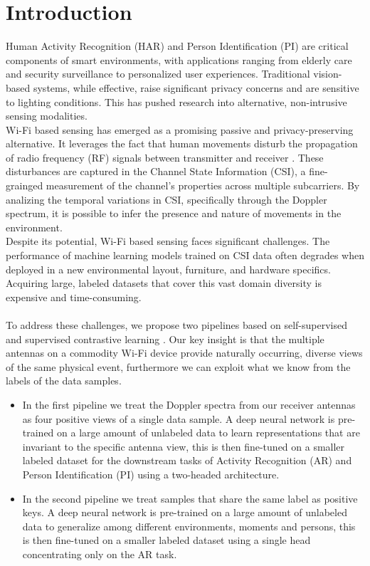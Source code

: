 
\section{Introduction}
\label{sec:introduction}

Human Activity Recognition (HAR) and Person Identification (PI) are critical components of smart environments, with applications ranging from elderly care and security surveillance to personalized user experiences. Traditional vision-based systems, while effective, raise significant privacy concerns and are sensitive to lighting conditions. This has pushed research into alternative, non-intrusive sensing modalities.\\
Wi-Fi based sensing has emerged as a promising passive and privacy-preserving alternative. It leverages the fact that human movements disturb the propagation of radio frequency (RF) signals between transmitter and receiver \cite{sharp}. These disturbances are captured in the Channel State Information (CSI), a fine-grainged measurement of the channel's properties across multiple subcarriers. By analizing the temporal variations in CSI, specifically through the Doppler spectrum, it is possible to infer the presence and nature of movements in the environment.\\
Despite its potential, Wi-Fi based sensing faces significant challenges. The performance of machine learning models trained on CSI data often degrades when deployed in a new environmental layout, furniture, and hardware specifics. Acquiring large, labeled datasets that cover this vast domain diversity is expensive and time-consuming.
\\\\
To address these challenges, we propose two pipelines based on self-supervised \cite{contrastive} and supervised contrastive learning \cite{supcon}.
Our key insight is that the multiple antennas on a commodity Wi-Fi device provide naturally occurring, diverse views of the same physical event, furthermore we can exploit what we know from the labels of the data samples.
\begin{itemize}
    \item In the first pipeline we treat the Doppler spectra from our receiver antennas as four positive views of a single data sample. A deep neural network is pre-trained on a large amount of unlabeled data to learn representations that are invariant to the specific antenna view, this is then fine-tuned on a smaller labeled dataset for the downstream tasks of Activity Recognition (AR) and Person Identification (PI) using a two-headed architecture.
    \item In the second pipeline we treat samples that share the same label as positive keys. A deep neural network is pre-trained on a large amount of unlabeled data to generalize among different environments, moments and persons, this is then fine-tuned on a smaller labeled dataset using a single head concentrating only on the AR task.
\end{itemize}
